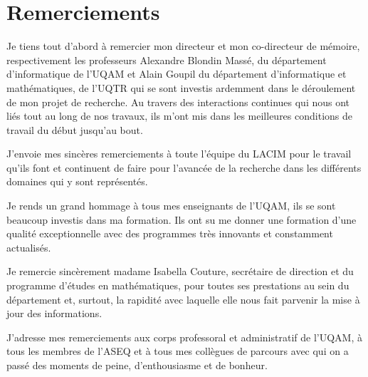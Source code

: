 \chapter*{Remerciements}
Je tiens tout d'abord à remercier mon directeur et mon co-directeur de mémoire, respectivement les professeurs  Alexandre Blondin Massé, du département d’informatique de l’UQAM et Alain  Goupil  du département d’informatique et mathématiques, de l’UQTR qui se sont investis ardemment dans le déroulement de mon projet de recherche. Au travers des interactions continues qui nous ont liés tout au long de nos travaux, ils m’ont mis dans les  meilleures conditions de travail du début jusqu’au bout.  

J'envoie mes sincères remerciements à toute l’équipe du LACIM pour le travail qu’ils font et continuent de faire pour l’avancée de la recherche dans les différents domaines qui y sont représentés.  

Je rends un grand hommage à tous mes enseignants de l’UQAM, ils se  sont beaucoup investis dans ma formation. Ils ont su me donner une formation d’une qualité exceptionnelle avec des programmes très innovants et constamment actualisés.
 
Je remercie  sincèrement madame Isabella Couture, secrétaire de direction et du programme d'études en mathématiques, pour toutes ses prestations au sein du département et, surtout, la rapidité avec laquelle elle nous fait parvenir la mise à jour des informations.

J'adresse mes remerciements aux corps professoral et administratif de l'UQAM, à tous les membres de l'ASEQ et à tous mes collègues de parcours avec qui on a passé des moments de peine, d'enthousiasme et de bonheur. 